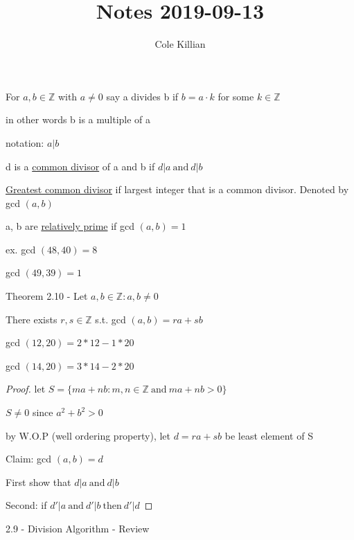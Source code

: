 \documentclass[class=scrartcl, crop=false]{standalone}
\begin{document}
\title{Notes 2019-09-13}
\author{Cole Killian}

\begin{theorem}
 For $a, b \in \mathbb{Z}$ with $a \neq 0$ 
say a divides b if $b = a \cdot k $ for some $k \in \mathbb{Z}$ 

in other words b is a multiple of a

notation: $a | b$

d is a \underline{common divisor} of a and b if  $d | a \ \text{and} \ d | b$

\underline{Greatest common divisor} if largest integer that is a common divisor. Denoted by  gcd $(a, b)$

a, b are \underline{relatively prime} if gcd  $(a, b) = 1$

ex. gcd $(48, 40) = 8$ 

gcd $(49, 39) = 1$
 
\end{theorem}


\begin{theorem}
      Theorem 2.10 - Let $a, b \in \mathbb{Z} : a, b \neq 0$

     There exists $r, s \in \mathbb{Z}$ s.t. gcd $(a, b) = ra + sb$
\end{theorem}

\begin{example}
gcd $(12, 20) = 2 * 12 - 1 * 20$

gcd  $(14, 20) = 3 * 14 - 2 * 20$
\end{example}
\begin{proof}
 let $S = \{ma + nb: m, n \in \mathbb{Z} \ \text{and} \ ma + nb > 0\}$

$S \neq 0 $ since $a^2 + b^2 > 0$

by W.O.P (well ordering property), let $d = ra + sb$ be least element of S

Claim: gcd $(a, b) = d$

First show that  $d | a \ \text{and} \ d | b$

Second: if $d' | a \ \text{and} \ d' | b \ \text{then} \ d'|d$ 
 
\end{proof}


\begin{theorem}
2.9 - Division Algorithm - Review
\end{theorem}
\end{document}

